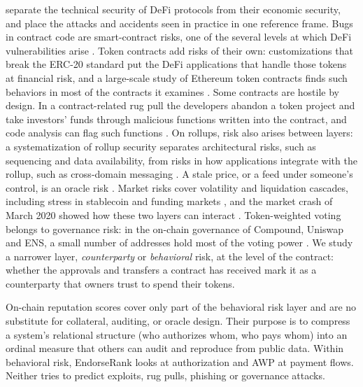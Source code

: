 
\textcite{werner2022sok} separate the technical security of DeFi protocols from their economic security, and \textcite{zhou2023sok} place the attacks and accidents seen in practice in one reference frame. Bugs in contract code are smart-contract risks, one of the several levels at which DeFi vulnerabilities arise \parencite{li2022defisecurity}. Token contracts add risks of their own: customizations that break the ERC-20 standard put the DeFi applications that handle those tokens at financial risk, and a large-scale study of Ethereum token contracts finds such behaviors in most of the contracts it examines \parencite{li2026erc20risk}. Some contracts are hostile by design. In a contract-related rug pull the developers abandon a token project and take investors' funds through malicious functions written into the contract, and code analysis can flag such functions \parencite{lin2024crpwarner}. On rollups, risk also arises between layers: a systematization of rollup security separates architectural risks, such as sequencing and data availability, from risks in how applications integrate with the rollup, such as cross-domain messaging \parencite{efimov2026rollup}. A stale price, or a feed under someone's control, is an oracle risk \parencite{angeris2020oracles}. Market risks \parencite{perez2021liquidations} cover volatility and liquidation cascades, including stress in stablecoin and funding markets \parencite{klagesmundt2020stablecoins}, and the market crash of March 2020 showed how these two layers can interact \parencite{gudgeon2020crisis}. Token-weighted voting belongs to governance risk: in the on-chain governance of Compound, Uniswap and ENS, a small number of addresses hold most of the voting power \parencite{fritsch2024voting}. We study a narrower layer, \emph{counterparty} or \emph{behavioral} risk, at the level of the contract: whether the approvals and transfers a contract has received mark it as a counterparty that owners trust to spend their tokens.

On-chain reputation scores cover only part of the behavioral risk layer and are no substitute for collateral, auditing, or oracle design. Their purpose is to compress a system's relational structure (who authorizes whom, who pays whom) into an ordinal measure that others can audit and reproduce from public data. Within behavioral risk, EndorseRank looks at authorization and AWP at payment flows. Neither tries to predict exploits, rug pulls, phishing or governance attacks.

